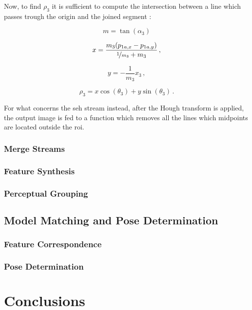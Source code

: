 Now, to find $\rho_3$ it is sufficient to compute the intersection between a line which passes trough the origin and the joined segment :

\begin{equation}
m = \tan(\alpha_3)
\end{equation}

\begin{equation}
x = \frac{m_3(p_{1a,x}-p_{1a,y})}{\nicefrac{1}{m_3} + m_3} \,,
\end{equation}

\begin{equation}
y = - \frac{1}{m_3} x_3 \,,
\end{equation}

\begin{equation}
\rho_3 = x \cos (\theta_3) +  y \sin (\theta_3) \,.
\end{equation}

For what concerns the \acrshort{seh} stream instead, after the Hough transform is applied, the output image is fed to a function which removes all the lines which midpoints are located outside the \acrshort{roi}.

\subsubsection{Merge Streams}

\subsubsection{Feature Synthesis}

\subsubsection{Perceptual Grouping}

\subsection{Model Matching and Pose Determination}

\subsubsection{Feature Correspondence}

\subsubsection{Pose Determination}

\section{Conclusions}


